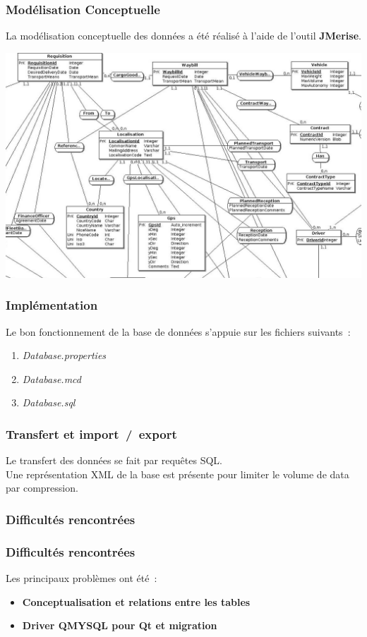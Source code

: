 \begin{frame}
\frametitle{Modélisation Conceptuelle}
La modélisation conceptuelle des données a été réalisé à l'aide de l'outil \textbf{JMerise}.\\
\begin{center}
\includegraphics[scale=0.15]{Images/DatabaseSize}
\end{center}
\end{frame}

\begin{frame}
\frametitle{Implémentation}
Le bon fonctionnement de la base de données s'appuie sur les fichiers suivants~:
\begin{enumerate}
	\item<2-> \emph{Database.properties}
	\item<3-> \emph{Database.mcd}
	\item<4-> \emph{Database.sql}
\end{enumerate}
\end{frame}

\begin{frame}
\frametitle{Transfert et import~/~export}
Le transfert des données se fait par requêtes SQL.\\
Une représentation XML de la base est présente pour limiter le volume de data par compression.\\
\end{frame}

\subsubsection{Difficultés rencontrées}

\begin{frame}
\frametitle{Difficultés rencontrées}
Les principaux problèmes ont été~:
\begin{itemize}
\item<2-> \textbf{Conceptualisation et relations entre les tables}
\item<3-> \textbf{Driver QMYSQL pour Qt et migration}
\end{itemize}
\end{frame}
